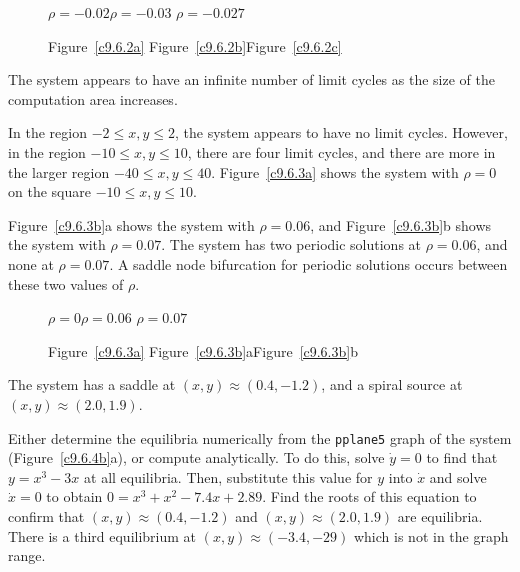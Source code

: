 \documentclass{ximera}
\begin{document}
\begin{figure}[htb]
                       \centerline{%
                       }
		\centerline{$\rho = -0.02$\hspace{1.1in}$\rho = -0.03$
\hspace{1.1in}$\rho = -0.027$}
		\centerline{Figure~\ref{c9.6.2a}\hspace{1.2in}
Figure~\ref{c9.6.2b}\hspace{1.2in}Figure~\ref{c9.6.2c}}
\end{figure}

\ans The system appears to have an infinite number of limit cycles
as the size of the computation area increases.

\soln In the region $-2 \leq x,y \leq 2$, the system appears to have no
limit cycles.  However, in the region $-10 \leq x,y \leq 10$, there are
four limit cycles, and there are more in the larger region $-40 \leq x,y
\leq 40$.  Figure~\ref{c9.6.3a} shows the system with $\rho = 0$ on the
square $-10 \leq x,y \leq 10$.

Figure~\ref{c9.6.3b}a shows the system with $\rho = 0.06$, and 
Figure~\ref{c9.6.3b}b shows the system with $\rho = 0.07$.  The system
has two periodic solutions at $\rho = 0.06$, and none at $\rho = 0.07$.
A saddle node bifurcation for periodic solutions occurs between these
two values of $\rho$.

\begin{figure}[htb]
                       \centerline{%
                       }
		\centerline{$\rho = 0$\hspace{1.3in}$\rho = 0.06$
\hspace{1.3in}$\rho = 0.07$}
		\centerline{Figure~\ref{c9.6.3a}\hspace{1.2in}
Figure~\ref{c9.6.3b}a\hspace{1.2in}Figure~\ref{c9.6.3b}b}
\end{figure}

\ans The system has a saddle at $(x,y) \approx (0.4,-1.2)$, and a 
spiral source at $(x,y) \approx (2.0,1.9)$.

\soln Either determine the equilibria numerically from the {\tt pplane5}
graph of the system (Figure~\ref{c9.6.4b}a), or compute analytically.  To
do this, solve $\dot{y} = 0$ to find that $y = x^3 - 3x$ at all equilibria.
Then, substitute this value for $y$ into $\dot{x}$ and solve $\dot{x} = 0$
to obtain $0 = x^3 + x^2 - 7.4x + 2.89$.  Find the roots of this equation
to confirm that $(x,y) \approx (0.4,-1.2)$ and $(x,y) \approx (2.0,1.9)$
are equilibria.  There is a third equilibrium at $(x,y) \approx
(-3.4,-29)$ which is not in the graph range.
\end{document}
